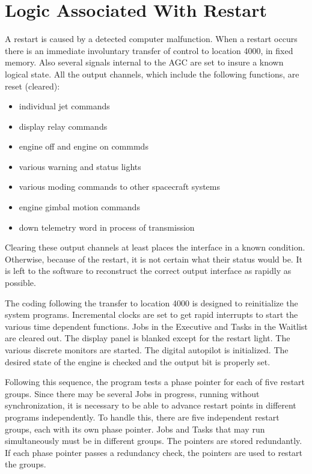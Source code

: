 \documentclass[oxford]{ahsan}
\begin{document}
\section{Logic Associated With Restart}

A restart is caused by a detected computer malfunction. When a restart occurs there is
an immediate involuntary transfer of control to location 4000, in fixed memory. Also
several signals internal to the AGC are set to insure a known logical state. All the
output channels, which include the following functions, are reset (cleared):

\begin{itemize}
    \item individual jet commands 
    \item display relay commands 
    \item engine off and engine on commmds 
    \item various warning and status lights 
    \item various moding commands to other spacecraft systems 
    \item engine gimbal motion commands 
    \item down telemetry word in process of transmission
\end{itemize}

Clearing these output channels at least places the interface in a known condition.
Otherwise, because of the restart, it is not certain what their status would be. It is
left to the software to reconstruct the correct output interface as rapidly as
possible.

The coding following the transfer to location 4000 is designed to reinitialize the
system programs. Incremental clocks are set to get rapid interrupts to start the
various time dependent functions. Jobs in the Executive and Tasks in the Waitlist  are
cleared out. The display panel is blanked except for the restart light. The various
discrete monitors are started. The digital autopilot is initialized. The desired state
of the engine is checked and the output bit is properly set.

Following this sequence, the program tests a phase pointer for each of five restart
groups. Since there may be several Jobs in progress, running without synchronization,
it is necessary to be able to advance restart points in different programs
independently. To handle this, there are five independent restart groups, each with its
own phase pointer. Jobs and Tasks that may run simultaneously must be in different
groups. The pointers are stored redundantly. If each phase pointer passes a redundancy
check, the pointers are used to restart the groups.
\end{document}
